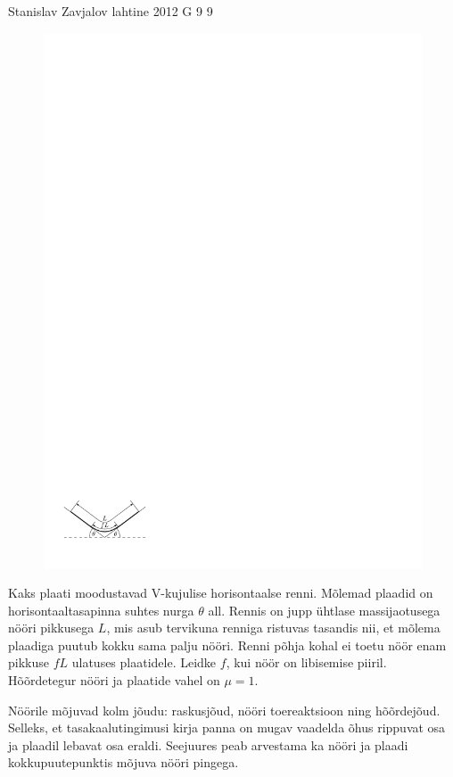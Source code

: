 {Stanislav Zavjalov} %
{lahtine} %
{2012} %
{G 9} %
{9} %
{
\ifStatement
\begin{figure}
\includegraphics[width=\linewidth]{2012-lahg-09-n88r_ipe}
\end{figure}
Kaks plaati moodustavad V-kujulise horisontaalse renni. Mõlemad plaadid on
horisontaaltasapinna suhtes nurga $\theta$ all.
Rennis on jupp ühtlase
massijaotusega nööri pikkusega $L$, mis asub tervikuna renniga ristuvas tasandis
nii, et mõlema plaadiga puutub kokku sama palju nööri.
Renni põhja kohal ei toetu nöör enam pikkuse $fL$
ulatuses plaatidele. Leidke $f$, kui nöör on libisemise piiril. Hõõrdetegur nööri ja plaatide
vahel on $\mu = 1$.
\fi


\ifHint
Nöörile mõjuvad kolm jõudu: raskusjõud, nööri toereaktsioon ning hõõrdejõud. Selleks, et tasakaalutingimusi kirja panna on mugav vaadelda õhus rippuvat osa ja plaadil lebavat osa eraldi. Seejuures peab arvestama ka nööri ja plaadi kokkupuutepunktis mõjuva nööri pingega.
\fi


}
